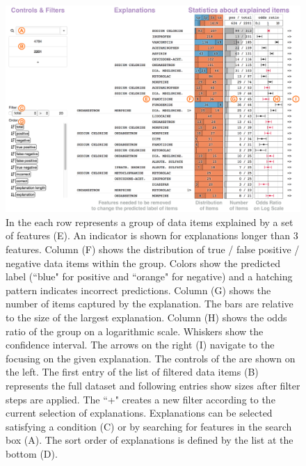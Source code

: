 \begin{figure}
\centering
\includegraphics[width=0.8\linewidth]{explainer/controlexplain}%
\caption[The \tabB.]{
In the \textbf{\tabB} each row represents a group of data items explained by a set of features (E).
An indicator is shown for explanations longer than 3 features.
Column (F) shows the distribution of true / false positive / negative data items within the group.
Colors show the predicted label (``blue" for positive and ``orange" for negative) and a hatching pattern indicates incorrect predictions.
Column (G) shows the number of items captured by the explanation.
The bars are relative to the size of the largest explanation.
Column (H) shows the odds ratio of the group on a logarithmic scale.
Whiskers show the confidence interval.
The arrows on the right (I) navigate to the \tabC focusing on the given explanation. The controls of the \tabB are shown on the left.
The first entry of the list of filtered data items (B) represents the full dataset and following entries show sizes after filter steps are applied.
The ``+" creates a new filter according to the current selection of explanations.
Explanations can be selected satisfying a condition (C) or by searching for features in the search box (A).
The sort order of explanations is defined by the list at the bottom (D).
}
\label{figs:expl_main}
\end{figure}